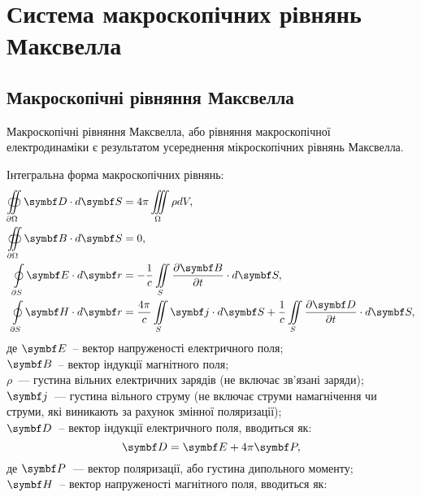 \newpage
\chapter{Система \mbox{макроскопічних} рівнянь Максвелла}


\section{Макроскопічні рівняння Максвелла}

Макроскопічні рівняння Максвелла, або рівняння макроскопічної електродинаміки є результатом усереднення мікроскопічних рівнянь Максвелла.

Інтегральна форма макроскопічних рівнянь:
\begin{align}
	\oiint\limits_{\partial\Omega} \Dfield\cdot d\vect{S} & = 4\pi\iiint\limits_{\Omega}\rho dV,   \label{essInt
	I}                                                                                                         \\
	\oiint\limits_{\partial\Omega} \Bfield\cdot d\vect{S} & = 0,   \label{essInt
	II}                                                                                                                                   \\
	\oint\limits_{\partial S} \Efield\cdot d\vect{r}  & = - \frac1c \iint\limits_S
	\frac{\partial\Bfield}{\partial t}\cdot d\vect{S},  \label{essInt
	III}                                                             \\
	\oint\limits_{\partial S} \Hfield\cdot d\vect{r}  & =\dfrac{4\pi}{c} \iint\limits_S \vect{j}\cdot d\vect{S} +\frac{1}{c} \iint\limits_S
	\frac{\partial\Dfield}{\partial t}\cdot d\vect{S},  \label{essInt IV}
\end{align}
де $ \Efield $~-- вектор напруженості електричного поля;\\
\hspace*{3ex}$ \Bfield $~-- вектор індукції магнітного поля; \\
\hspace*{3ex}$ \rho $~--- густина вільних електричних зарядів (не включає зв'язані заряди); \\
\hspace*{3ex}$\vect{j}$~--- густина вільного струму (не включає струми намагнічення чи струми, які виникають за рахунок змінної поляризації); \\
$ \Dfield $~-- вектор індукції електричного поля, вводиться як:
\begin{equation}
	\Dfield = \Efield + 4\pi\vect{P},
\end{equation}
де $\vect{P}$~---  вектор поляризації, або густина дипольного моменту;\\
\hspace*{2ex} $ \Hfield $~-- вектор напруженості магнітного поля, вводиться як:

